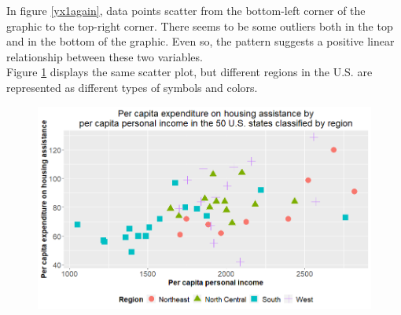 \documentclass[12pt,letterpaper]{article}
\begin{document}
\begin{itemize}
		In figure \ref{yx1again}, data points scatter from the bottom-left corner of the graphic to the top-right corner. There seems to be some outliers both in the top and in the bottom of the graphic. Even so, the pattern suggests a positive linear relationship between these two variables.\\
		
		Figure \ref{yx1Region} displays the same scatter plot, but different regions in the U.S. are represented as different types of symbols and colors.

		\vspace{.5cm}

		

		\begin{figure}[H]
			\centering
			\caption{}
			\label{yx1Region}
			\includegraphics[width=0.9\linewidth]{Rplot9}
		\end{figure}
				
	\end{itemize}
		
\end{document}
